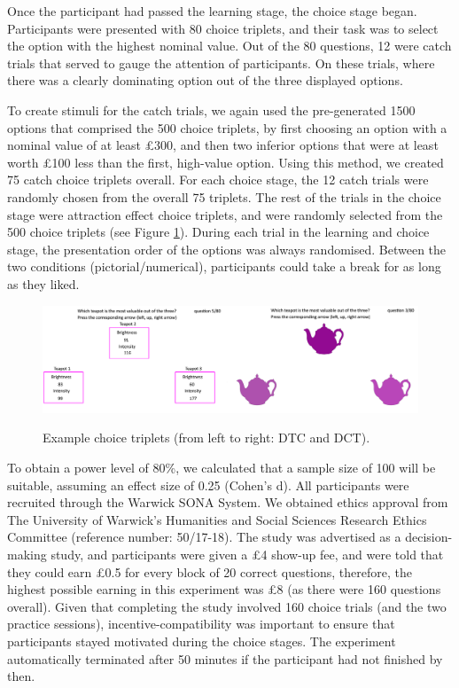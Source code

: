 \documentclass[11pt,a4paper]{article}
\begin{document}
Once the participant had passed the learning stage, the choice stage began. Participants were presented with 80 choice triplets, and their task was to select the option with the highest nominal value. Out of the 80 questions, 12 were catch trials that served to gauge the attention of participants. On these trials, where there was a clearly dominating option out of the three displayed options. 

To create stimuli for the catch trials, we again used the pre-generated 1500 options that comprised the 500 choice triplets, by first choosing an option with a nominal value of at least £300, and then two inferior options that were at least worth £100 less than the first, high-value option. Using this method, we created 75 catch choice triplets overall. For each choice stage, the 12 catch trials were randomly chosen from the overall 75 triplets. The rest of the trials in the choice stage were attraction effect choice triplets, and were randomly selected from the 500 choice triplets (see Figure \ref{fig:choicetriplets}). During each trial in the learning and choice stage, the presentation order of the options was always randomised. Between the two conditions (pictorial/numerical), participants could take a break for as long as they liked.

\begin{figure}[htp!]
\centering
\caption{Example choice triplets (from left to right: DTC and DCT).}
\includegraphics[width=1\textwidth]{./choice_triplets.png}
\label{fig:choicetriplets}
\end{figure}


To obtain a power level of 80\%, we calculated that a sample size of 100 will be suitable, assuming
an effect size of 0.25 (Cohen’s d). All participants were recruited through the Warwick SONA System. We obtained ethics approval from The University of Warwick’s Humanities and Social Sciences Research Ethics Committee (reference number: 50/17-18). The study was advertised as a decision-making study, and participants were given a £4 show-up fee, and were told that they could earn £0.5 for every block of 20 correct questions, therefore, the highest possible earning in this experiment was £8 (as there were 160 questions overall). Given that completing the study involved 160 choice trials (and the two practice sessions), incentive-compatibility was important to ensure that participants stayed motivated during the choice stages. The experiment automatically terminated after 50 minutes if the participant had not finished by then. 
\end{document}
